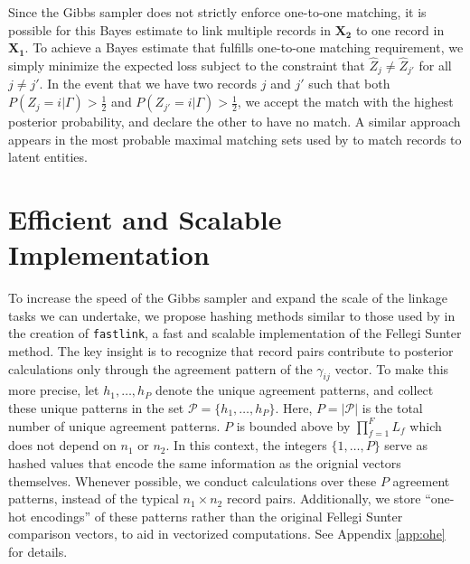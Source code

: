\documentclass[ba]{imsart}
\begin{document}
Since the Gibbs sampler does not strictly enforce one-to-one matching, it is possible for this Bayes estimate to link multiple records in $\bm{X_2}$ to one record in $\bm{X_1}$. To achieve a Bayes estimate that fulfills one-to-one matching requirement, we simply minimize the expected loss subject to the constraint that $\hat{Z}_j \neq \hat{Z}_{j'}$ for all $j \neq j'$. In the event that we have two records $j$ and $j'$ such that both $P(Z_j = i |\Gamma) > \frac{1}{2}$ and $ P(Z_{j'} = i |\Gamma) > \frac{1}{2}$, we accept the match with the highest posterior probability, and declare the other to have no match. A similar approach appears in the most probable maximal matching sets used by \cite{steorts_bayesian_2016} to match records to latent entities.


\section{Efficient and Scalable Implementation}
\label{sec:efficiency}

To increase the speed of the Gibbs sampler and expand the scale of the linkage tasks we can undertake, we propose hashing methods similar to those used by \cite{enamorado2019using} in the creation of \texttt{fastlink}, a fast and scalable implementation of the Fellegi Sunter method. The key insight is to recognize that record pairs contribute to posterior calculations only through the agreement pattern of the $\gamma_{ij}$ vector. To make this more precise, let $h_1, \ldots, h_P$ denote the unique agreement patterns, and collect these unique patterns in the set $\mathcal{P} = \{h_1, \ldots, h_P\}$. Here,  $P = |\mathcal{P}|$ is the total number of unique agreement patterns. \(P\) is bounded above by \(\prod_{f=1}^F L_f\) which does not depend on \(n_1\) or \(n_2\). In this context, the integers $\{1, \ldots, P\}$ serve as hashed values that encode the same information as the orignial vectors themselves. Whenever possible, we conduct calculations over these \(P\) agreement patterns, instead of the typical \(n_1 \times n_2\) record pairs. Additionally, we store ``one-hot encodings'' of these patterns rather than the original Fellegi Sunter comparison vectors, to aid in vectorized computations. See Appendix \ref{app:ohe} for details.   
\end{document}
